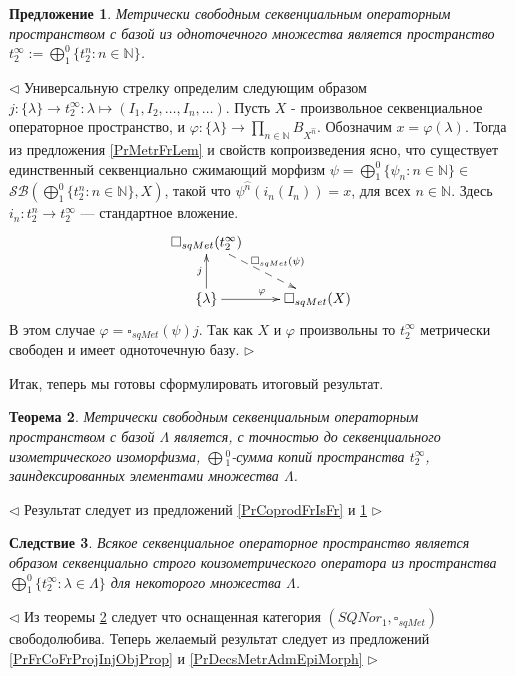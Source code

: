 \documentclass[12pt]{article}
\newtheorem{theorem}{Теорема}[subsection]
\newtheorem{proposition}[theorem]{Предложение}
\newtheorem{corollary}[theorem]{Следствие}
\newenvironment{proof}{\par $\triangleleft$}{$\triangleright$}
\begin{document}
\begin{proposition}\label{PrOnePtMetrFr} Метрически свободным секвенциальным операторным пространством с базой из одноточечного множества является пространство $t_2^{\infty} := \bigoplus_1^0 \{t_2^n: n \in \mathbb{N}\}$.
\end{proposition}
\begin{proof}
Универсальную стрелку определим следующим образом $j:\{\lambda\}\to t_2^\infty:\lambda\mapsto(I_1,I_2,\ldots,I_n,\ldots)$. Пусть $X$ - произвольное секвенциальное операторное пространство, и 
$\varphi:\{\lambda\}\to \prod_{n \in \mathbb{N}} B_{X^{\wideparen{n}}}$. Обозначим $x=\varphi(\lambda)$. Тогда из предложения \ref{PrMetrFrLem} и свойств копроизведения ясно, что существует 
единственный секвенциально сжимающий морфизм $\psi=\bigoplus_1^0\{\psi_n:n\in\mathbb{N}\}\in$ \\$  \mathcal{SB}\left(\bigoplus_1^0\{ t_2^n:n\in\mathbb{N}\}, X\right)$, такой что $\psi^{\wideparen{n}}(i_n(I_n)) = x$, 
для всех $n \in \mathbb{N}$. Здесь $i_n:t_2^n\to t_2^\infty$ --- стандартное вложение.
$$
\xymatrix{
{\square_{sqMet} (t_2^\infty)} \ar@{-->}[dr]^{\square_{sqMet} (\psi)} & \\
{\{\lambda\}} \ar[u]^{j} \ar[r]^{\varphi} &{\square_{sqMet} (X)}}
$$
В этом случае $\varphi=\square_{sqMet}(\psi) j$. Так как $X$ и $\varphi$ произвольны то $t_2^\infty$ метрически свободен и имеет одноточечную базу. 
\end{proof}

Итак, теперь мы готовы сформулировать итоговый результат.

\begin{theorem}\label{ThMetrFrDesc} Метрически свободным секвенциальным операторным пространством с базой $\Lambda$ является, с точностью до секвенциального изометрического изоморфизма, 
$\bigoplus{}_1^0$-сумма копий пространства $t_2^{\infty}$, заиндексированных элементами множества $\Lambda$. 
\end{theorem}
\begin{proof}
Результат следует из предложений \ref{PrCoprodFrIsFr} и \ref{PrOnePtMetrFr}
\end{proof}

\begin{corollary}\label{CorSQSpaceIsImgMetrAdmEpiMorph}
Всякое секвенциальное операторное пространство является образом секвенциально строго коизометрического оператора из пространства $\bigoplus_1^0\{t_2^\infty:\lambda\in\Lambda\}$ для некоторого множества $\Lambda$.
\end{corollary}
\begin{proof}
Из теоремы \ref{ThMetrFrDesc} следует что оснащенная категория $(SQNor_1,\square_{sqMet})$ свободолюбива. Теперь желаемый результат следует из предложений \ref{PrFrCoFrProjInjObjProp} и \ref{PrDecsMetrAdmEpiMorph}
\end{proof}
\end{document}
